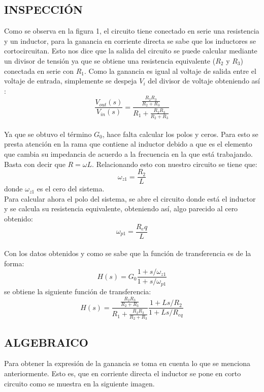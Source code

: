 \documentclass[letterpaper,12pt]{article}
\begin{document}
\subsection*{INSPECCIÓN}
Como se observa en la figura 1, el circuito tiene conectado en serie una resistencia y un inductor, para la ganancia en corriente directa se sabe que los inductores se cortocircuitan. Esto nos dice que la salida del circuito se puede calcular mediante un divisor de tensión ya que se obtiene una resistencia equivalente ($R_2$ y $R_3$) conectada en serie con $R_1$. Como la ganancia es igual al voltaje de salida entre el voltaje de entrada, simplemente se despeja $V_i$ del divisor de voltaje obteniendo así :
$$\frac{V_{out}(s)}{V_{in}(s)}= \frac{\frac{R_2R_3}{R_2+R_3}}{R_1+\frac{R_2R_3}{R_2+R_3}}$$
\\
Ya que se obtuvo el término $G_0$, hace falta calcular los polos y ceros. Para esto se presta atención en la rama que contiene al inductor debido a que es el elemento que cambia su impedancia de acuerdo a la frecuencia en la que está trabajando. Basta con decir que $R={\omega}L$. Relacionando esto con nuestro circuito se tiene que:
$$\omega_{z1}=\frac{R_2}{L}$$
donde $\omega_{z1}$ es el cero del sistema.\\
Para calcular ahora el polo del sistema, se abre el circuito donde está el inductor y se calcula su resistencia equivalente, obteniendo así, algo parecido al cero obtenido:
$$\omega_{p1}= \frac{R_eq}{L}$$ \\

Con los datos obtenidos y como se sabe que la función de transferencia es de la forma:
$$H(s)= G_0\frac{1+s/\omega_{z1}}{1+s/\omega_{p1}}$$
se obtiene la siguiente función de transferencia:
$$H(s)=\frac{\frac{R_2R_3}{R_2+R_3}}{R_1+\frac{R_2R_3}{R_2+R_3}}\frac{1+Ls/R_2}{1+Ls/R_{eq}}$$

\subsection*{ALGEBRAICO}
Para obtener la expresión de la ganancia se toma en cuenta lo que se menciona anteriormente. Esto es, que en corriente directa el inductor se pone en corto circuito como se muestra en la siguiente imagen.\\
\end{document}
